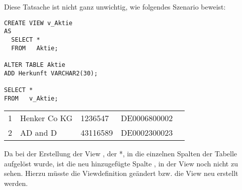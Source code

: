 		\clearpage
        Diese Tatsache ist nicht ganz unwichtig, wie folgendes Szenario beweist:
        \begin{lstlisting}[language=oracle_sql,caption={Eine Szenario mit Tücke},label=sql08_28]
CREATE VIEW v_Aktie
AS
  SELECT *
  FROM   Aktie;

ALTER TABLE Aktie
ADD Herkunft VARCHAR2(30);

SELECT *
FROM   v_Aktie;
        \end{lstlisting}
        \begin{center}
          \begin{small}
            \tablehead{}
            \begin{msoraclesql}
              \begin{supertabular}{rllll}
                1 & Henker Co KG & 1236547 & DE0006800002  \\
                2 & AD and D & 43116589 & DE0002300023  \\
              \end{supertabular}
            \end{msoraclesql}
          \end{small}
        \end{center}
        Da bei der Erstellung der View , der *, in die einzelnen Spalten der Tabelle  aufgelöst wurde, ist die neu hinzugefügte Spalte , in der View  noch nicht zu sehen. Hierzu müsste die Viewdefinition geändert bzw. die View neu erstellt werden.

